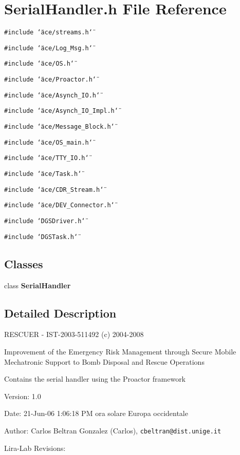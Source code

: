 \section{Serial\-Handler.h File Reference}
\label{SerialHandler_8h}
{\tt \#include \char`\"{}ace/streams.h\char`\"{}}\par
{\tt \#include \char`\"{}ace/Log\_\-Msg.h\char`\"{}}\par
{\tt \#include \char`\"{}ace/OS.h\char`\"{}}\par
{\tt \#include \char`\"{}ace/Proactor.h\char`\"{}}\par
{\tt \#include \char`\"{}ace/Asynch\_\-IO.h\char`\"{}}\par
{\tt \#include \char`\"{}ace/Asynch\_\-IO\_\-Impl.h\char`\"{}}\par
{\tt \#include \char`\"{}ace/Message\_\-Block.h\char`\"{}}\par
{\tt \#include \char`\"{}ace/OS\_\-main.h\char`\"{}}\par
{\tt \#include \char`\"{}ace/TTY\_\-IO.h\char`\"{}}\par
{\tt \#include \char`\"{}ace/Task.h\char`\"{}}\par
{\tt \#include \char`\"{}ace/CDR\_\-Stream.h\char`\"{}}\par
{\tt \#include \char`\"{}ace/DEV\_\-Connector.h\char`\"{}}\par
{\tt \#include \char`\"{}DGSDriver.h\char`\"{}}\par
{\tt \#include \char`\"{}DGSTask.h\char`\"{}}\par
\subsection*{Classes}
\begin{CompactItemize}
\item 
class {\bf Serial\-Handler}
\end{CompactItemize}


\subsection{Detailed Description}
RESCUER - IST-2003-511492 (c) 2004-2008

Improvement of the Emergency Risk Management through Secure Mobile Mechatronic Support to Bomb Disposal and Rescue Operations

Contains the serial handler using the Proactor framework \begin{Desc}
\item[Version:]1.0 \end{Desc}
\begin{Desc}
\item[Date:]21-Jun-06 1:06:18 PM ora solare Europa occidentale \end{Desc}
\begin{Desc}
\item[Author:]Carlos Beltran Gonzalez (Carlos), {\tt cbeltran@dist.unige.it} 

Lira-Lab Revisions:\end{Desc}
